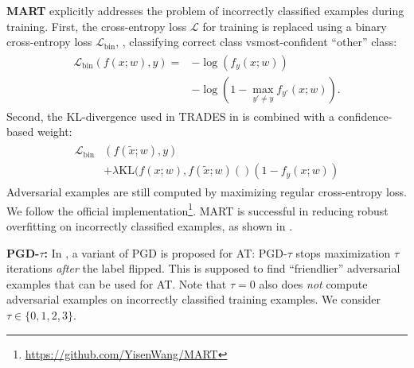 \textbf{MART} \cite{WangICLR2020} explicitly addresses the problem of incorrectly classified examples during training. First, the cross-entropy loss $\mathcal{L}$ for training is replaced using a binary cross-entropy loss $\mathcal{L}_{\text{bin}}$, \ie, classifying correct class vs\onedot most-confident ``other'' class:
\begin{align}
	\begin{split}
		\mathcal{L}_{\text{bin}}(f(x; w), y) =& -\log(f_y(x;w))\\
		& - \log(1 - \max_{y' \neq y} f_{y'}(x; w)).
	\end{split}
\end{align}
Second, the KL-divergence used in TRADES in  is combined with a confidence-based weight:
\begin{align}
	\begin{split}
		\mathcal{L}_{\text{bin}}&(f(\tilde{x}; w), y)\\ &+ \lambda \text{KL}(f(x;w), f(\tilde{x}; w)() (1 - f_y(x; w))
	\end{split}
\end{align}
Adversarial examples are still computed by maximizing regular cross-entropy loss. We follow the official implementation\footnote{\url{https://github.com/YisenWang/MART}}. MART is successful in reducing robust overfitting on incorrectly classified examples, as shown in .

\textbf{PGD-$\tau$:}
%
In \cite{ZhangARXIV2020}, a variant of PGD is proposed for AT: PGD-$\tau$ stops maximization $\tau$ iterations \emph{after} the label flipped. This is supposed to find ``friendlier'' adversarial examples that can be used for AT. Note that $\tau = 0$ also does \emph{not} compute adversarial examples on incorrectly classified training examples. We consider $\tau \in \{0, 1, 2, 3\}$.


